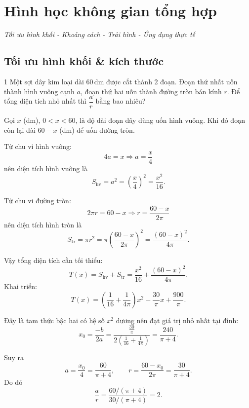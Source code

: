 
\chapter{Hình học không gian tổng hợp}
\begin{center}
  \textit{\color{ForumDarkGray}Tối ưu hình khối - Khoảng cách - Trải hình - Ứng dụng thực tế}
\end{center}

\section{Tối ưu hình khối \& kích thước}
\usetikzlibrary{calc}

\begin{baitoan}{1 \hfill {}}
Một sợi dây kim loại dài 60\,dm được cắt thành 2 đoạn. Đoạn thứ nhất uốn thành hình vuông cạnh $a$, đoạn thứ hai uốn thành đường tròn bán kính $r$. Để tổng diện tích nhỏ nhất thì $\dfrac{a}{r}$ bằng bao nhiêu?
\end{baitoan}

\begin{loigiai}
Gọi $x$ (dm), $0<x<60$, là độ dài đoạn dây dùng uốn hình vuông.  
Khi đó đoạn còn lại dài $60-x$ (dm) để uốn đường tròn.

Từ chu vi hình vuông:
\[
4a=x \Rightarrow a=\frac{x}{4}
\]
nên diện tích hình vuông là
\[
S_{\text{hv}}=a^2=\left(\frac{x}{4}\right)^2=\frac{x^2}{16}.
\]

Từ chu vi đường tròn:
\[
2\pi r=60-x \Rightarrow r=\frac{60-x}{2\pi}
\]
nên diện tích hình tròn là
\[
S_{\text{tr}}=\pi r^2=\pi\left(\frac{60-x}{2\pi}\right)^2
=\frac{(60-x)^2}{4\pi}.
\]

Vậy tổng diện tích cần tối thiểu:
\[
T(x)=S_{\text{hv}}+S_{\text{tr}}
=\frac{x^2}{16}+\frac{(60-x)^2}{4\pi}.
\]
Khai triển:
\[
T(x)=\left(\frac{1}{16}+\frac{1}{4\pi}\right)x^2-\frac{30}{\pi}x+\frac{900}{\pi}.
\]

Đây là tam thức bậc hai có hệ số $x^2$ dương nên đạt giá trị nhỏ nhất tại đỉnh:
\[
x_0=\frac{-b}{2a}
=\frac{\frac{30}{\pi}}{2\left(\frac{1}{16}+\frac{1}{4\pi}\right)}
=\frac{240}{\pi+4}.
\]

Suy ra
\[
a=\frac{x_0}{4}=\frac{60}{\pi+4},\qquad
r=\frac{60-x_0}{2\pi}=\frac{30}{\pi+4}.
\]
Do đó
\[
\frac{a}{r}=\frac{60/(\pi+4)}{30/(\pi+4)}=\boxed{2}.
\]
\end{loigiai}

